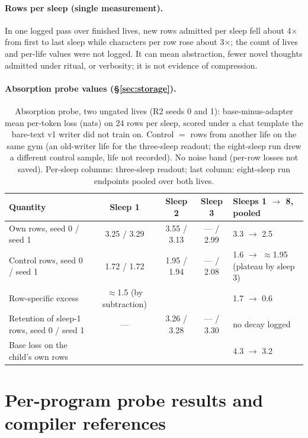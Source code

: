 \documentclass{article}
\begin{document}
\paragraph{Rows per sleep (single measurement).} In one logged pass over finished lives, new rows admitted per sleep fell about 4$\times$ from first to last sleep while characters per row rose about 3$\times$; the count of lives and per-life values were not logged. It can mean abstraction, fewer novel thoughts admitted under ritual, or verbosity; it is not evidence of compression.

\paragraph{Absorption probe values (\S\ref{sec:storage}).}
\begin{table}[h]
\centering
\footnotesize
\caption{Absorption probe, two ungated lives (R2 seeds 0 and 1): base-minus-adapter mean per-token loss (nats) on 24 rows per sleep, scored under a chat template the bare-text v1 writer did not train on. Control $=$ rows from another life on the same gym (an old-writer life for the three-sleep readout; the eight-sleep run drew a different control sample, life not recorded). No noise band (per-row losses not saved). Per-sleep columns: three-sleep readout; last column: eight-sleep run endpoints pooled over both lives.}
\label{tab:absorb}
\begin{tabular}{lcccl}
\toprule
Quantity & Sleep 1 & Sleep 2 & Sleep 3 & Sleeps 1 $\to$ 8, pooled \\
\midrule
Own rows, seed 0 / seed 1 & 3.25 / 3.29 & 3.55 / 3.13 & --- / 2.99 & 3.3 $\to$ 2.5 \\
Control rows, seed 0 / seed 1 & 1.72 / 1.72 & 1.95 / 1.94 & --- / 2.08 & 1.6 $\to$ $\approx$1.95 (plateau by sleep 3) \\
Row-specific excess & $\approx$1.5 (by subtraction) & & & 1.7 $\to$ 0.6 \\
Retention of sleep-1 rows, seed 0 / seed 1 & --- & 3.26 / 3.28 & --- / 3.30 & no decay logged \\
Base loss on the child's own rows & & & & 4.3 $\to$ 3.2 \\
\bottomrule
\end{tabular}
\end{table}

\section{Per-program probe results and compiler references}
\label{app:perprogram}
\end{document}
